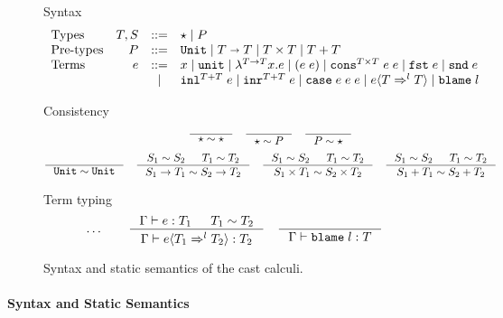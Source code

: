 \documentclass[acmsmall,review]{acmart}\settopmatter{printfolios=true,printccs=false,printacmref=false}
\newcommand{\stxrule}[3]{\text{#2} & #1 & ::= & #3\\}
\newcommand{\stxrulecont}[1]{& & | & #1 \\}
\newcommand{\plus}[0]{+}
\newcommand{\judgetype}[3]{#1 \vdash #2 : #3}
\newcommand{\POOunit}[0]{\mathtt{Unit}}
\newcommand{\POOfun}[2]{#1 \shortrightarrow #2}
\newcommand{\POOprod}[2]{#1 \times #2}
\newcommand{\POOsum}[2]{#1 \plus #2}
\newcommand{\eOOvar}[1]{#1}
\newcommand{\eOOsole}[0]{\mathtt{unit}}
\newcommand{\eOOlam}[4]{\lambda^{#1\rightarrow{}#2}#3.#4}
\newcommand{\eOOapp}[2]{(#1 \; #2)}
\newcommand{\eOOcons}[4]{\mathtt{cons}^{\POOprod{#1}{#2}} \; #3 \; #4}
\newcommand{\eOOcar}[1]{\mathtt{fst} \; #1}
\newcommand{\eOOcdr}[1]{\mathtt{snd} \; #1}
\newcommand{\eOOinl}[3]{\mathtt{inl}^{\POOsum{#1}{#2}} \; #3}
\newcommand{\eOOinr}[3]{\mathtt{inr}^{\POOsum{#1}{#2}} \; #3}
\newcommand{\eOOcase}[3]{\mathtt{case} \; #1 \; #2 \; #3}
\newcommand{\eOOcast}[4]{#1 \langle \cOOcast{#2}{#3}{#4} \rangle}
\newcommand{\eOOblame}[1]{\mathtt{blame} \; #1}
\newcommand{\cOOcast}[3]{#1 \Rightarrow^{#2} #3}
\begin{document}
\begin{figure}
  Syntax
  \[
  \begin{array}{lrcl}
  \stxrule{T, S}{Types}{
    \star \mid{}
    P
  }
  \stxrule{P}{Pre-types}{
    \POOunit \mid
    \POOfun{T}{T} \mid
    \POOprod{T}{T} \mid
    \POOsum{T}{T}
  }
  \stxrule{e}{Terms}{
    \eOOvar{x} \mid{}
    \eOOsole{} \mid{}
    \eOOlam{T}{T}{x}{e} \mid
    \eOOapp{e}{e} \mid
    \eOOcons{T}{T}{e}{e} \mid
    \eOOcar{e} \mid
    \eOOcdr{e}
  }
  \stxrulecont{
    \eOOinl{T}{T}{e} \mid
    \eOOinr{T}{T}{e} \mid
    \eOOcase{e}{e}{e} \mid
    \eOOcast{e}{T}{l}{T} \mid
    \eOOblame{l}
  }
  \end{array}
  \]
  
  Consistency
  \begin{gather*}
  \inference{}{
    \star \sim \star
  } \quad
  \inference{}{
    \star \sim P
  } \quad
  \inference{}{
    P \sim \star
  } \\[1ex]
  \inference{}{
    \POOunit \sim \POOunit
  } \quad
  \inference{
    S_1 \sim S_2 &
    T_1 \sim T_2
  }{
    S_1 \rightarrow T_1 \sim S_2 \rightarrow T_2
  } \quad
  \inference{
    S_1 \sim S_2 &
    T_1 \sim T_2
  }{
    S_1 \times T_1 \sim S_2 \times T_2
  } \quad
  \inference{
    S_1 \sim S_2 &
    T_1 \sim T_2
  }{
    S_1 \plus T_1 \sim S_2 \plus T_2
  }
  \end{gather*}
  
  Term typing
  \fbox{$\judgetype{\Gamma}{e}{T}$}
  \begin{gather*}
          \dots \qquad
    \inference{
      \Gamma \vdash e : T_1 & T_1 \sim T_2
    }{
      \judgetype{\Gamma}{\eOOcast{e}{T_1}{l}{T_2}}{T_2}
    } \quad
    \inference{
    }{
      \judgetype{\Gamma}{\eOOblame{l}}{T}
    }
  \end{gather*}
  
  \caption{Syntax and static semantics of the cast calculi.}
  \label{fig:blame-static}
\end{figure}


\paragraph{Syntax and Static Semantics}
\end{document}
